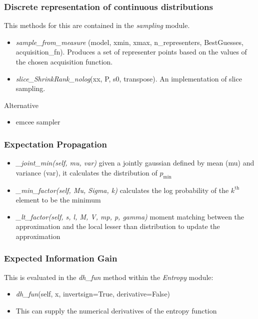 \documentclass[10pt,handout]{beamer}
\begin{document}
\begin{frame}
\frametitle{Discrete representation of continuous distributions}

This methods for this are contained in the \emph{sampling} module.

\begin{itemize}
  \item \emph{sample\_from\_measure}
  (model, xmin, xmax, n\_representers, BestGuesses, acquisition\_fn). Produces 
  a set of representer points based on the values of the chosen acquisition 
  function.
  
  \item \emph{slice\_ShrinkRank\_nolog}(xx, P, s0, transpose). An implementation
  of slice sampling.
\end{itemize}

Alternative 

\begin{itemize}
\item emcee sampler
\end{itemize}

\end{frame}

\begin{frame}
\frametitle{Expectation Propagation}
\begin{itemize}
  \item\emph{\_joint\_min(self, mu, var)}
  given a jointly gaussian defined by mean (mu) and  variance (var), it calculates the distribution of $p_\text{min}$ 
  \item\emph{\_min\_factor(self, Mu, Sigma, k)}
  calculates the log probability of the $k^\text{th}$ element to be the minimum
  \item\emph{\_lt\_factor(self, s, l, M, V, mp, p, gamma)}
  moment matching between the approximation and the local lesser than distribution to update the approximation
\end{itemize}
\end{frame}

\begin{frame}
\frametitle{Expected Information Gain}

This is evaluated in the \emph{dh\_fun} method within the \emph{Entropy} module:

\begin{itemize}
  \item \emph{dh\_fun}(self, x, invertsign=True, derivative=False)
  \item This can supply the numerical derivatives of the entropy function

\end{itemize}


\end{frame}
\end{document}
